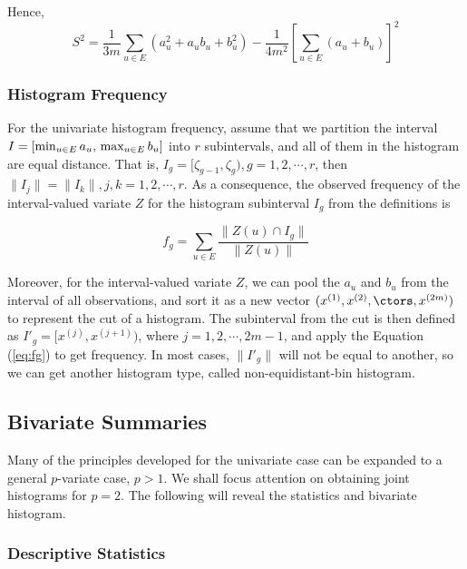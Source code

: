 \documentclass[article]{jss}
\begin{document}
Hence,
\begin{equation}\label{eq:var}
S^2 = \frac{1}{3m} \sum_{u \in E}(a_u^2+a_ub_u+b_u^2)-\frac{1}{4m^2}\left[ \sum_{u \in E}(a_u+b_u) \right]^2
\end{equation}

\subsubsection{Histogram Frequency}\label{sec:hist}

For the univariate histogram frequency, assume that we partition the interval $I=[\min_{u \in E} a_u,\\ \max_{u \in E} b_u]$ into $r$ subintervals, and all of them in the histogram are equal distance. That is, $I_g = [\zeta_{g-1},\zeta_{g}),g=1,2,\cdots,r$, then $\| I_j \| = \| I_k \| , j,k=1,2,\cdots,r$. As a consequence, the observed frequency of the interval-valued variate $Z$ for the histogram subinterval $I_g$ from the definitions is

\begin{equation}\label{eq:fg}
f_g = \sum_{u \in E}\frac{\| Z(u) \cap I_g \|}{\| Z(u) \|}
\end{equation}

Moreover, for the interval-valued variate $Z$, we can pool the $a_u$ and $b_u$ from the interval of all observations, and sort it as a new vector $(x^{(1)},x^{(2)},\ctors,x^{(2m)})$ to represent the cut of a histogram. The subinterval from the cut is then defined as $I'_g = [x^{(j)},x^{(j+1)})$, where $j = 1,2,\cdots, 2m-1$, and apply the Equation (\ref{eq:fg}) to get frequency. In most cases, $\| I'_g \|$ will not be equal to another, so we can get another histogram type, called non-equidistant-bin histogram.


\subsection{Bivariate Summaries}

Many of the principles developed for the univariate case can be expanded to a general $p$-variate case, $p > 1$. We shall focus attention on obtaining joint histograms for $p = 2$. The following will reveal the statistics and bivariate histogram.

\subsubsection{Descriptive Statistics}
\end{document}
